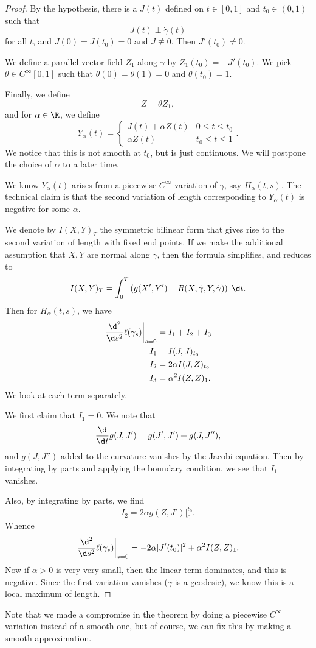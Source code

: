 \documentclass[a4paper]{article}
\begin{document}
\begin{proof}
  By the hypothesis, there is a $J(t)$ defined on $t \in [0, 1]$ and $t_0 \in (0, 1)$ such that
  \[
    J(t) \perp \dot{\gamma}(t)
  \]
  for all $t$, and $J(0) = J(t_0) = 0$ and $J \not\equiv 0$. Then $J'(t_0) \not= 0$.

  We define a parallel vector field $Z_1$ along $\gamma$ by $Z_1(t_0) = -J'(t_0)$. We pick $\theta \in C^\infty[0, 1]$ such that $\theta(0) = \theta(1) = 0$ and $\theta(t_0) = 1$.

  Finally, we define
  \[
    Z = \theta Z_1,
  \]
  and for $\alpha \in \R$, we define
  \[
    Y_\alpha(t) =
    \begin{cases}
      J(t) + \alpha Z(t) & 0 \leq t \leq t_0\\
      \alpha Z(t) & t_0 \leq t \leq 1
    \end{cases}.
  \]
  We notice that this is not smooth at $t_0$, but is just continuous. We will postpone the choice of $\alpha$ to a later time.

  We know $Y_\alpha(t)$ arises from a piecewise $C^\infty$ variation of $\gamma$, say $H_\alpha(t, s)$. The technical claim is that the second variation of length corresponding to $Y_\alpha(t)$ is negative for some $\alpha$.

  We denote by $I(X, Y)_T$ the symmetric bilinear form that gives rise to the second variation of length with fixed end points. If we make the additional assumption that $X, Y$ are normal along $\gamma$, then the formula simplifies, and reduces to
  \[
    I(X, Y)_T = \int_0^T \left(g(X', Y') - R(X, \dot{\gamma}, Y, \dot{\gamma})\right)\;\d t.
  \]
  Then for $H_\alpha(t, s)$, we have
  \begin{align*}
    \left.\frac{\d^2}{\d s^2}\ell(\gamma_s)\right|_{s = 0} &= I_1 + I_2 + I_3\\
    I_1 &= I(J, J)_{t_0}\\
    I_2 &= 2\alpha I(J, Z)_{t_0}\\
    I_3 &= \alpha^2 I(Z, Z)_1.
  \end{align*}
  We look at each term separately.

  We first claim that $I_1 = 0$. We note that
  \[
    \frac{\d}{\d t} g(J, J') = g(J', J') + g(J, J''),
  \]
  and $g(J, J'')$ added to the curvature vanishes by the Jacobi equation. Then by integrating by parts and applying the boundary condition, we see that $I_1$ vanishes.

  Also, by integrating by parts, we find
  \[
    I_2 = \left. 2 \alpha g(Z, J') \right|_0^{t_0}.
  \]
  Whence
  \[
    \left.\frac{\d^2}{\d s^2}\ell(\gamma_s)\right|_{s = 0} = -2\alpha |J'(t_0)|^2 + \alpha^2 I(Z, Z)_1.
  \]
  Now if $\alpha > 0$ is very very small, then the linear term dominates, and this is negative. Since the first variation vanishes ($\gamma$ is a geodesic), we know this is a local maximum of length.
\end{proof}
Note that we made a compromise in the theorem by doing a piecewise $C^\infty$ variation instead of a smooth one, but of course, we can fix this by making a smooth approximation.
\end{document}
